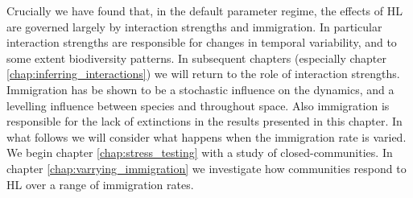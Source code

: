 Crucially we have found that, in the default parameter regime, the effects of HL are governed largely by interaction strengths and immigration. In particular interaction strengths are responsible for changes in temporal variability, and to some extent biodiversity patterns. In subsequent chapters (especially chapter \ref{chap:inferring_interactions}) we will return to the role of interaction strengths. Immigration has be shown to be a stochastic influence on the dynamics, and a levelling influence between species and throughout space. Also immigration is responsible for the lack of extinctions in the results presented in this chapter. In what follows we will consider what happens when the immigration rate is varied. We begin chapter \ref{chap:stress_testing} with a study of closed-communities. In chapter \ref{chap:varrying_immigration} we investigate how communities respond to HL over a range of immigration rates. 
   




%	
%	
%	
%	
%	
%	

